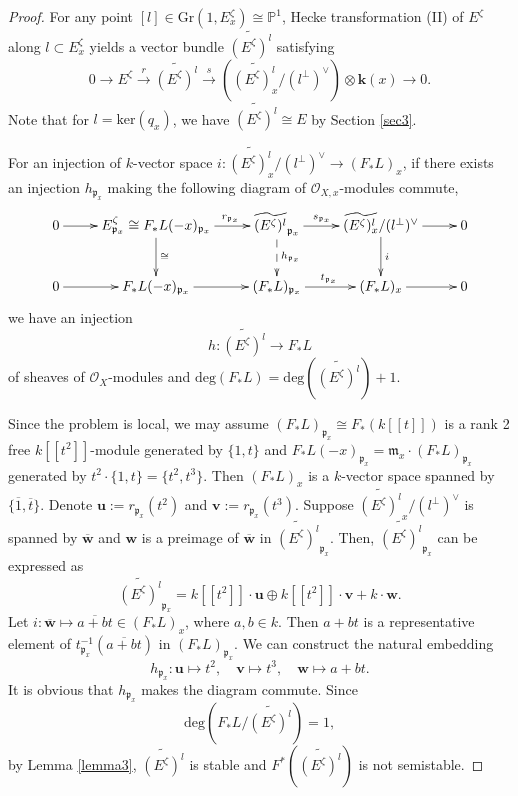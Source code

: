 \documentclass[10pt,a4paper]{amsart}
\begin{document}
\begin{proof}
For any point $[l] \in \mathrm{Gr}(1,E_x^\zeta)\cong \mathbb{P}^1$, Hecke transformation (II) of $E^\zeta$ along $l\subset E_x^\zeta$ yields a vector bundle $\widetilde{(E^{\zeta})^l}$ satisfying
\begin{equation}\label{applyfunctor}
    0 \to E^\zeta \xrightarrow{r} \widetilde{(E^{\zeta})^l}\xrightarrow{s} (\widetilde{(E^{\zeta})_x^l}/(l^{\bot})^{\vee})\otimes \textbf{k}(x) \to 0.
\end{equation}
Note that for $l = \mathrm{ker}(q_x)$, we have $\widetilde{(E^\zeta)^{l}} \cong E$ by Section \ref{sec3}. 

For an injection of $k$-vector space $i: \widetilde{(E^{\zeta})_x^l}/(l^{\bot})^{\vee} \to (F_*L)_x$, if there exists an injection $h_{\mathfrak{p}_x}$ making the following diagram of $\mathcal{O}_{X,x}$-modules commute, 
$$\xymatrix{
0 \ar[r] & E_{\mathfrak{p}_x}^{\zeta} \cong F_*L(-x)_{\mathfrak{p}_x} \ar[r]^{\qquad r_{\mathfrak{p}_x}} \ar[d]^{\cong} & \widetilde{(E^\zeta)^l}_{\mathfrak{p}_x} \ar[r]^{s_{\mathfrak{p}_x}\quad} \ar@{-->}[d]^{h_{\mathfrak{p}_x}}& \widetilde{(E^{\zeta})_x^l}/(l^{\bot})^{\vee} \ar[r]\ar[d]^{i} & 0\\
0\ar[r]  &F_*L(-x)_{\mathfrak{p}_x} \ar[r]  & (F_*L)_{\mathfrak{p}_x} \ar[r]^{t_{\mathfrak{p}_x}} & (F_*L)_x \ar[r] & 0
}$$
we have an injection 
$$h:\widetilde{(E^\zeta)^l} \to F_*L$$ 
of sheaves of $\mathcal{O}_{X}$-modules and $\mathrm{deg}(F_*L) = \mathrm{deg}(\widetilde{(E^\zeta)^l})+1$.

Since the problem is local, we may assume $(F_*L)_{\mathfrak{p}_x} \cong F_*(k[[t]])$ is a rank 2 free $k[[t^2]]$-module generated by $\{1,t\}$ and $F_*L(-x)_{\mathfrak{p}_x}=\mathfrak{m}_x \cdot (F_*L)_{\mathfrak{p}_x}$ generated by $t^2 \cdot \{1,t\} = \{t^2, t^3\}$. Then $(F_*L)_x$ is a $k$-vector space spanned by $\{\overline{1}, \overline{t} \}$. Denote $\boldsymbol{u}:=r_{\mathfrak{p}_x}(t^2)$ and $\boldsymbol{v}:=r_{\mathfrak{p}_x}(t^3)$.  Suppose $\widetilde{(E^\zeta)^l}_x/(l^{\bot})^{\vee}$ is spanned by  $\overline{\boldsymbol{w}}$ and $\boldsymbol{w}$ is a preimage of $\overline{\boldsymbol{w}}$ in $\widetilde{(E^\zeta)^l}_{\mathfrak{p}_x}$. Then, $\widetilde{(E^\zeta)^l}_{\mathfrak{p}_x}$ can be expressed as 
$$\widetilde{(E^\zeta)^l}_{\mathfrak{p}_x} = k[[t^2]] \cdot \boldsymbol{u}   \oplus k[[t^2]] \cdot \boldsymbol{v}  + k\cdot \boldsymbol{w}.$$
Let $i: \overline{\boldsymbol{w}} \mapsto \overline{a+bt} \in (F_*L)_x$, where $a,b \in k$. Then $a+bt$ is a representative element of $t_{\mathfrak{p}_x}^{-1}(\overline{a+bt})$ in $(F_*L)_{\mathfrak{p}_x}$. We can construct the natural embedding 
\begin{equation*}
    h_{\mathfrak{p}_x}: \boldsymbol{u} \mapsto t^2, \quad  \boldsymbol{v} \mapsto t^3, \quad  \boldsymbol{w} \mapsto a+bt.
\end{equation*}
It is obvious that $h_{\mathfrak{p}_x}$ makes the diagram commute. Since $$\mathrm{deg}(F_*L/\widetilde{(E^\zeta)^l})=1,$$
by Lemma \ref{lemma3}, $\widetilde{(E^\zeta)^l}$ is stable and $F^*(\widetilde{(E^\zeta)^l})$ is not semistable. 


\end{proof}
\end{document}
